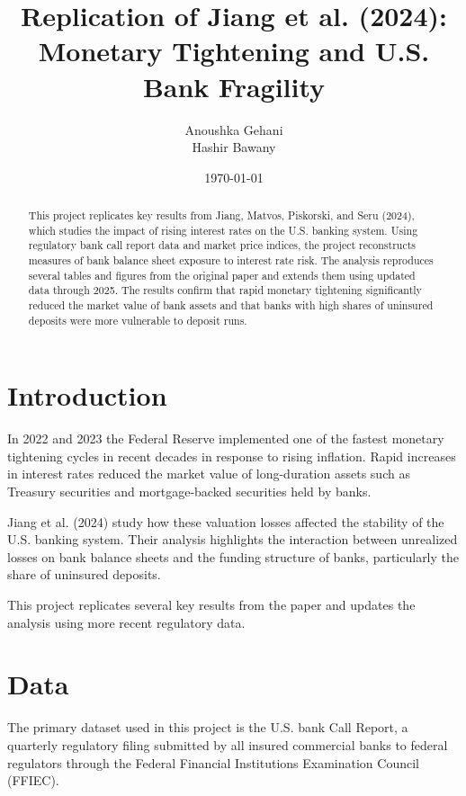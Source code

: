 \documentclass[12pt]{article}
\title{Replication of Jiang et al. (2024):\\
Monetary Tightening and U.S. Bank Fragility}
\author{
Anoushka Gehani \\
Hashir Bawany
}
\date{\today}
\begin{document}
\maketitle

\doublespacing

\begin{abstract}

This project replicates key results from Jiang, Matvos, Piskorski, and Seru (2024), 
which studies the impact of rising interest rates on the U.S. banking system. 
Using regulatory bank call report data and market price indices, the project 
reconstructs measures of bank balance sheet exposure to interest rate risk. 
The analysis reproduces several tables and figures from the original paper 
and extends them using updated data through 2025. The results confirm that 
rapid monetary tightening significantly reduced the market value of bank assets 
and that banks with high shares of uninsured deposits were more vulnerable to 
deposit runs.

\end{abstract}

\section{Introduction}

In 2022 and 2023 the Federal Reserve implemented one of the fastest monetary 
tightening cycles in recent decades in response to rising inflation. 
Rapid increases in interest rates reduced the market value of long-duration 
assets such as Treasury securities and mortgage-backed securities held by banks.

Jiang et al. (2024) study how these valuation losses affected the stability 
of the U.S. banking system. Their analysis highlights the interaction between 
unrealized losses on bank balance sheets and the funding structure of banks, 
particularly the share of uninsured deposits.

This project replicates several key results from the paper and updates the 
analysis using more recent regulatory data.

\section{Data}

The primary dataset used in this project is the U.S. bank Call Report, a 
quarterly regulatory filing submitted by all insured commercial banks to 
federal regulators through the Federal Financial Institutions Examination 
Council (FFIEC).
\end{document}
